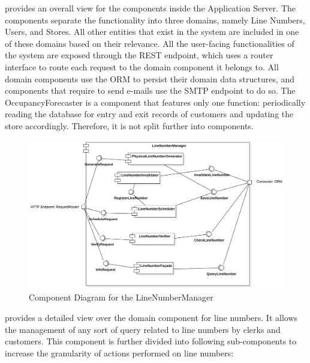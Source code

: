  provides an overall view for the components inside the Application Server.
The components separate the functionality into three domains, namely Line Numbers, Users, and Stores.
All other entities that exist in the system are included in one of these domains based on their relevance.
All the user-facing functionalities of the system are exposed through the REST endpoint, which uses a router interface to route each request to the domain component it belongs to.
All domain components use the ORM to persist their domain data structures, and components that require to send e-mails use the SMTP endpoint to do so.
The OccupancyForecaster is a component that features only one function: periodically reading the database for entry and exit records of customers and updating the store accordingly.
Therefore, it is not split further into components.
\begin{figure}[H]
    \centering
    \includegraphics[height=0.4\textwidth]{Images/ComponentDiagrams/LineNumberManager.png}
    \caption{Component Diagram for the LineNumberManager}
    \label{fig:CDLineNumberManager}
\end{figure}
 provides a detailed view over the domain component for line numbers.
It allows the management of any sort of query related to line numbers by clerks and customers.
This component is further divided into following sub-components to increase the granularity of actions performed on line numbers:
